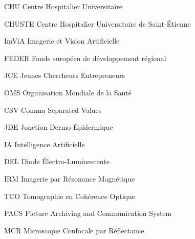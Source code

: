 
            {CHU}
            {Centre Hospitalier Universitaire}
            
            {CHUSTE}
            {Centre Hospitalier Universitaire de Saint-Étienne}
            
            {ImViA}
            {Imagerie et Vision Artificielle}
            
            {FEDER}
            {Fonds européen de développement régional}

            {JCE}
            {Jeunes Chercheurs Entrepreneurs}
  
            {OMS}
            {Organisation Mondiale de la Santé}    
            
            {CSV}
            {Comma-Separated Values}

            {JDE}
            {Jonction Dermo-Épidermique}
            
            {IA}
            {Intelligence Artificielle}
            
            {DEL}
            {Diode Électro-Luminescente}
            
            {IRM}
            {Imagerie par Résonance Magnétique}
            
            {TCO}
            {Tomographie en Cohérence Optique}

            {PACS}
            {Picture Archiving and Communication System}
            
            {MCR}
            {Microscopie Confocale par Réflectance}
            
